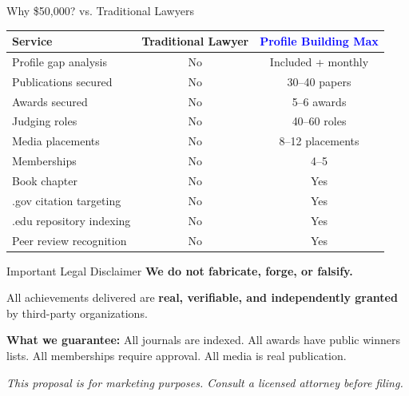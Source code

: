 \documentclass[aspectratio=169, 10pt]{beamer}
\begin{document}
	\begin{frame}{Why \$50,000? vs. Traditional Lawyers}
		\begin{table}
			\centering
			\small
			\begin{tabular}{lcc}
				\toprule
				Service & Traditional Lawyer & \textcolor{blue}{Profile Building Max} \\
				\midrule
				Profile gap analysis & No & Included + monthly \\
				Publications secured & No & 30–40 papers \\
				Awards secured & No & 5–6 awards \\
				Judging roles & No & 40–60 roles \\
				Media placements & No & 8–12 placements \\
				Memberships & No & 4–5 \\
				Book chapter & No & Yes \\
				.gov citation targeting & No & Yes \\
				.edu repository indexing & No & Yes \\
				Peer review recognition & No & Yes \\
				\bottomrule
			\end{tabular}
		\end{table}
	\end{frame}
	
	\begin{frame}{Important Legal Disclaimer}
		\centering
		\faBalanceScale \hspace{0.2cm} \textbf{We do not fabricate, forge, or falsify.}
		
		\vspace{0.3cm}
		All achievements delivered are \textbf{real, verifiable, and independently granted} by third-party organizations.
		
		\vspace{0.3cm}
		\textbf{What we guarantee:} All journals are indexed. All awards have public winners lists. All memberships require approval. All media is real publication.
		
		\vspace{0.3cm}
		\textit{This proposal is for marketing purposes. Consult a licensed attorney before filing.}
	\end{frame}
	
\end{document}
